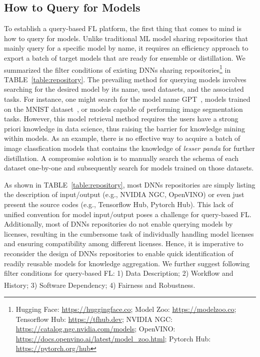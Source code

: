 
\subsection{How to Query for Models}
\label{sec:how2query}
To establish a query-based FL platform, the first thing that comes to mind is how to query for models.
Unlike traditional ML model sharing repositories that mainly query for a specific model by name, it requires an efficiency approach to export a batch of target models that are ready for ensemble or distillation.
We summarized the filter conditions of existing DNNs sharing repositories\footnote{Hugging Face: \url{https://huggingface.co}; Model Zoo: \url{https://modelzoo.co}; Tensorflow Hub: \url{https://tfhub.dev}; NVIDIA NGC: \url{https://catalog.ngc.nvidia.com/models};  OpenVINO: \url{https://docs.openvino.ai/latest/model\_zoo.html}; Pytorch Hub: \url{https://pytorch.org/hub}} in TABLE~\ref{table:repository}.
The prevailing method for querying models involves searching for the desired model by its name, used datasets, and the associated tasks.
For instance, one might search for the model name GPT~\cite{radford2019language}, models trained on the MNIST dataset~\cite{lecun2010mnist}, or models capable of performing image segmentation tasks.
However, this model retrieval method requires the users have a strong priori knowledge in data science, thus raising the barrier for knowledge mining within models.
As an example, there is no effective way to acquire a batch of image classfication models that contains the knowledge of \textit{lesser panda} for further distillation.
A compromise solution is to manually search the schema of each dataset one-by-one and subsequently search for models trained on those datasets.

As shown in TABLE~\ref{table:repository}, most DNNs repositories are simply listing the description of input/output (e.g., NVIDIA NGC, OpenVINO) or even just present the source codes (e.g., Tensorflow Hub, Pytorch Hub).
This lack of unified convention for model input/output poses a challenge for query-based FL.
Additionally, most of DNNs repositories do not enable querying models by licenses, resulting in the cumbersome task of individually handling model licenses and ensuring compatibility among different licenses.
Hence, it is imperative to reconsider the design of DNNs repositories to enable quick identification of readily reusable models for knowledge aggregation. 
We further suggest following filter conditions for query-based FL: 1) Data Description; 2) Workflow and History; 3) Software Dependency; 4) Fairness and Robustness\textsuperscript{}. %

